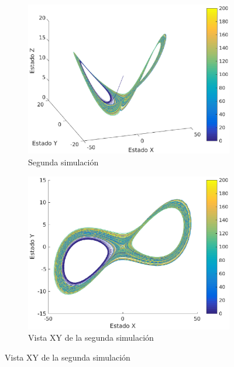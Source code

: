 \documentclass[12pt,letterpaper]{article}
\begin{document}
\begin{figure}
	\centering
	\begin{subfigure}[t]{0.36\textwidth}
		\includegraphics[width=\textwidth]{pictures/segunda_simulacion}
		\caption{Segunda simulación}
		\label{fig:simulacion2}
	\end{subfigure}
	\begin{subfigure}[t]{0.36\textwidth}
		\includegraphics[width=\textwidth]{pictures/segunda_simulacion_xy}
		\caption{Vista XY de la segunda simulación}
		\label{fig:simulacion2xy}
	\end{subfigure}

\end{figure}
\end{document}
